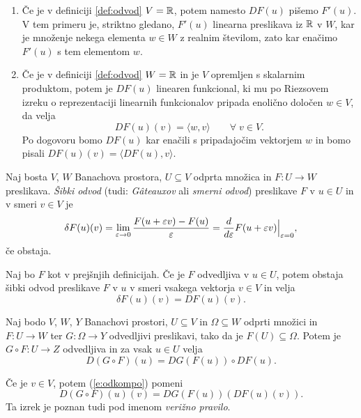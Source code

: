 \begin{dogovor} \label{d:riesz}
	\begin{enumerate}
		\item Če je v definiciji \ref{def:odvod} $V=\mathbb R$, potem namesto $DF(u)$ pišemo $F'(u)$.
		V tem primeru je, striktno gledano, $F'(u)$ linearna preslikava iz $\mathbb R$ v $W$, kar je
		množenje nekega elementa $w\in W$ z realnim številom, zato kar
		enačimo $F'(u)$ s tem elementom $w$.
		\item Če je v definiciji \ref{def:odvod} $W=\mathbb R$ in je $V$ opremljen s skalarnim produktom,
		potem je $DF(u)$ linearen funkcional, ki mu po Riezsovem izreku o reprezentaciji
		linearnih funkcionalov pripada enolično določen $w\in V$, da velja
		\[
			DF(u)(v)=\langle w,v\rangle \qquad\forall\; v\in V.
		\]
		Po dogovoru bomo $DF(u)$ kar enačili s pripadajočim vektorjem $w$ in bomo pisali
		$DF(u)(v)=\langle DF(u),v\rangle$.
	\end{enumerate}
\end{dogovor}

\begin{definicija}
	Naj bosta $V$, $W$ Banachova prostora, $U\subseteq V$ odprta
	množica in $F\colon U\to W$ preslikava. \emph{Šibki odvod} (tudi: \emph{Gâteauxov} ali
	\emph{smerni odvod}) preslikave $F$ v $u\in U$ in v smeri $v\in V$ je
	\begin{equation*} %
		\delta F(u)(v) =
		\lim_{\varepsilon\to 0}\frac{F(u+\varepsilon v)-F(u)}{\varepsilon}
		=\at{\frac{d}{d\varepsilon}F(u+\varepsilon v)}{\varepsilon = 0},
	\end{equation*}
	če obstaja.
\end{definicija}

\begin{trditev}
	Naj bo $F$ kot v prejšnjih definicijah. Če je $F$ odvedljiva v $u\in U$,
	potem obstaja šibki odvod preslikave $F$ v $u$ v smeri vsakega vektorja $v\in V$
	in velja
	\[
		\delta F(u)(v)=DF(u)(v).
	\]
\end{trditev}

\begin{izrek}
	Naj bodo $V$, $W$, $Y$ Banachovi prostori, $U\subseteq V$ in $\Omega\subseteq W$ odprti
	množici in $F\colon U\to W$ ter $G\colon\Omega\to Y$ odvedljivi preslikavi,
	tako da je $F(U)\subseteq\Omega$.
	Potem je $G\circ F\colon U\to Z$ odvedljiva in za vsak $u\in U$ velja
	\begin{equation} \label{e:odkompo}
		D(G\circ F)(u)=DG(F(u))\circ DF(u).
	\end{equation}
\end{izrek}
Če je $v\in V$, potem (\ref{e:odkompo}) pomeni
\[
	D(G\circ F)(u)(v)=DG(F(u))(DF(u)(v)).
\]
Ta izrek je poznan tudi pod imenom \emph{verižno pravilo}.

